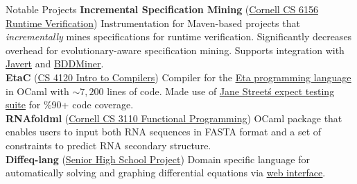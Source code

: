  
\begin{rSection}{Notable Projects}
	\textbf{Incremental Specification Mining} (\href{https://github.com/cyankaet/spec-miners}{Cornell CS 6156 Runtime Verification\ExternalLink}) Instrumentation for Maven-based projects that \textit{incrementally} mines specifications for runtime verification. Significantly decreases overhead for evolutionary-aware specification mining. Supports integration with \href{https://github.com/cyankaet/spec-miners/blob/master/miners/javert.sh}{\underline{Javert}} and \href{https://github.com/cyankaet/spec-miners/blob/master/miners/bddminer.sh}{\underline{BDDMiner}}.
	\\
	\textbf{EtaC} (\href{http://www.cs.cornell.edu/courses/cs4120/2023sp/}{CS 4120 Intro to Compilers\ExternalLink}) Compiler for the \href{https://www.cs.cornell.edu/courses/cs4120/2023sp/project/language.pdf}{\underline{Eta programming language}} in OCaml with $\sim 7,200$ lines of code. Made use of \href{https://blog.janestreet.com/the-joy-of-expect-tests/}{\underline{Jane Street\'s expect testing suite}} for \%90+ code coverage.
	\\
	\textbf{RNAfoldml} (\href{https://github.com/jpVinnie/RNAfoldml/}{Cornell CS 3110 Functional Programming\ExternalLink}) OCaml package that enables users to input both RNA sequences in FASTA format and a set of constraints to predict RNA secondary structure.
	\\
	\textbf{Diffeq-lang} (\href{https://github.com/jpVinnie/diffeq-lang/}{Senior High School Project\ExternalLink}) Domain specific language for automatically solving and graphing differential equations via \href{https://jpramos.me/diffeq-lang/web/}{\underline{web interface}}.
\end{rSection}